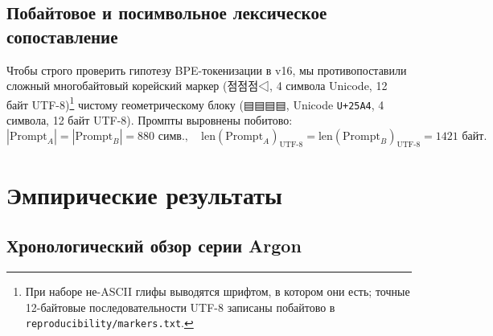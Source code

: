 \documentclass[11pt,a4paper]{article}
\newcommand{\marker}[1]{{\normalfont\markerfont #1}}
\newcommand{\marker}[1]{\texttt{#1}}
\begin{document}
\subsection{Побайтовое и посимвольное лексическое сопоставление}
Чтобы строго проверить гипотезу BPE-токенизации в v16, мы противопоставили сложный многобайтовый корейский маркер (\marker{점점점◁}, 4 символа Unicode, 12 байт UTF-8)\footnote{При наборе не-ASCII глифы выводятся шрифтом, в котором они есть; точные 12-байтовые последовательности UTF-8 записаны побайтово в \texttt{reproducibility/markers.txt}.} чистому геометрическому блоку (\marker{▤▤▤▤}, Unicode \texttt{U+25A4}, 4 символа, 12 байт UTF-8). Промпты выровнены побитово:
\begin{equation}
    |\text{Prompt}_A| = |\text{Prompt}_B| = 880 \text{ симв.}, \quad \text{len}(\text{Prompt}_A)_{\text{UTF-8}} = \text{len}(\text{Prompt}_B)_{\text{UTF-8}} = 1421 \text{ байт}.
\end{equation}

\section{Эмпирические результаты}

\subsection{Хронологический обзор серии Argon}
\end{document}
